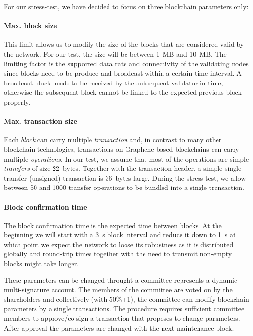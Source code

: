 For our stress-test, we have decided to focus on three blockchain parameters only:

\paragraph{Max. block size}
This limit allows us to modify the size of the blocks that are considered valid
by the network. For our test, the size will be between \SI{1}{MB} and
\SI{10}{MB}. The limiting factor is the supported data rate and connectivity of
the validating nodes since blocks need to be produce and broadcast within a
certain time interval. A broadcast block needs to be received by the subsequent
validator in time, otherwise the subsequent block cannot be linked to the
expected previous block properly.

\paragraph{Max. transaction size}
Each \emph{block} can carry multiple \emph{transaction} and, in contrast to
many other blockchain technologies, transactions on Graphene-based blockchains
can carry multiple \emph{operations}. In our test, we assume that most of the
operations are simple \emph{transfers} of size \SI{22}{bytes}. Together with
the transaction header, a simple single-transfer (unsigned) transaction is
\SI{36}{bytes} large. During the stress-test, we allow between \num{50} and
\num{1000} transfer operations to be bundled into a single transaction.

\paragraph{Block confirmation time}
The block confirmation time is the expected time between blocks. At the
beginning we will start with a \SI{3}{s} block interval and reduce it down to
\SI{1}{s} at which point we expect the network to loose its robustness as it
is distributed globally and round-trip times together with the need to transmit
non-empty blocks might take longer.

\bigskip
These parameters can be changed throught a committee represents a
dynamic multi-signature account. The members of the committee are voted
on by the shareholders and collectively (with 50\%+1), the committee can
modify blockchain parameters by a single transactions. The procedure
requires sufficient committee members to approve/co-sign a transaction
that proposes to change parameters. After approval the parameters are
changed with the next maintenance block.
